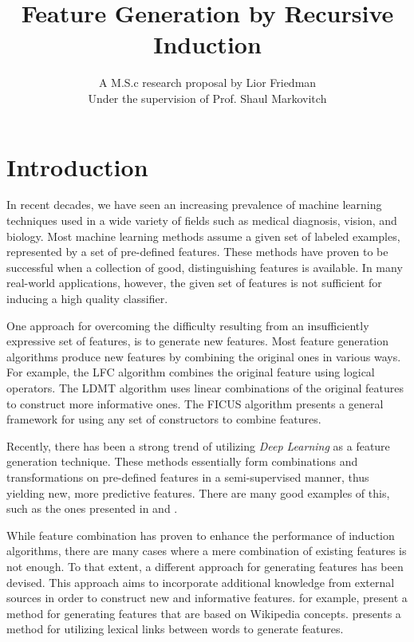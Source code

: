 \documentclass[12pt, a4paper]{article}
\theoremstyle{definition}
\begin{document}
\title{
	{
	Feature Generation by Recursive Induction%
	}\\
}
\author{
    {A M.S.c research proposal by Lior Friedman}\\
    {Under the supervision of Prof. Shaul Markovitch}
}

\maketitle

\section{Introduction}
\label{sec:Intro}
In recent decades, we have seen an increasing prevalence of machine learning techniques used in a wide variety of fields such as medical diagnosis, vision, and biology.
Most machine learning methods assume a given set of labeled examples, represented by a set of
pre-defined features. These methods have proven to be successful when a collection of good,
distinguishing features is available.
In many real-world applications, however, the given set of features is not sufficient for inducing a high quality classifier.

One approach for overcoming the difficulty resulting from an insufficiently expressive set of features, is to generate new features.  Most feature generation algorithms produce new features by combining the original ones in various ways.  For example, the LFC algorithm \citep{ragavan1993complex} combines the original feature using logical operators.  The LDMT algorithm \citep{utgo1991linear} uses linear combinations of the original features to construct more informative ones.  The FICUS algorithm \citep{markovitch2002feature} presents a general framework for using any set of constructors to combine features.

Recently, there has been a strong trend of utilizing \emph{Deep Learning} \citep{lecun1998gradient, bengio2009learning} as a feature generation technique. These methods essentially form combinations and transformations on pre-defined features in a semi-supervised manner, thus yielding new, more predictive features.
There are many good examples of this, such as the ones presented in \citet{plotz2011feature} and \citet{kim2013deep}.

While feature combination has proven to enhance the performance of induction algorithms, there are many cases where a mere combination of existing features is not enough.  To that extent, a different approach for generating features has been devised.  This approach aims to incorporate additional knowledge from external sources in order to construct new and informative features.
\citet{gabrilovich2006overcoming} for example, present a method for generating features that are based on Wikipedia concepts. \citet{jarmasz2012roget} presents a method for utilizing lexical links between words to generate features.
\end{document}
